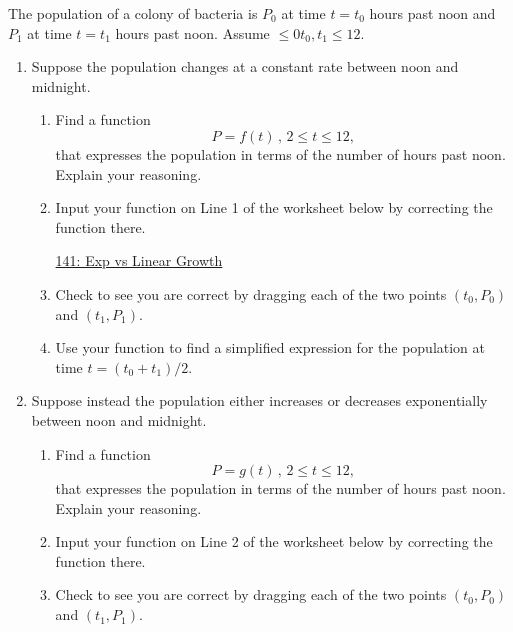 \documentclass{ximera}
\begin{document}
\begin{example} \label{Ex5434232388766}
The population of a colony of bacteria is $P_0$ at time $t=t_0$ hours past noon and $P_1$ at time $t=t_1$ hours past noon.
Assume $\leq 0 t_0, t_1 \leq 12$.

\begin{enumerate}

\item Suppose the population changes at a constant rate between noon and midnight.

\begin{enumerate}
\item Find a function 
\[
      P = f(t) \, , \, 2\leq t \leq 12 ,
\]
that expresses the population in terms of the number of hours past noon. Explain your reasoning.

\item Input your function on Line 1 of the worksheet below by correcting the function there.

\begin{onlineOnly}
    \begin{center}
\end{center}
\end{onlineOnly}

\href{https://www.desmos.com/calculator/vdwsk61zza}{141: Exp vs Linear Growth}

\item Check to see you are correct by dragging each of the two points $(t_0, P_0)$ and $(t_1, P_1)$.

\item Use your function to find a simplified expression for the population at time $t=(t_0+t_1)/2$.

\end{enumerate}


\item Suppose instead the population either increases or decreases exponentially between noon and midnight. 


\begin{enumerate}
\item Find a function 
\[
      P = g(t) \, , \, 2\leq t \leq 12 ,
\]
that expresses the population in terms of the number of hours past noon. Explain your reasoning.

\item Input your function on Line 2 of the worksheet below by correcting the function there.

\item Check to see you are correct by dragging each of the two points $(t_0, P_0)$ and $(t_1, P_1)$.


\end{enumerate}
\end{enumerate}
\end{example}
\end{document}
